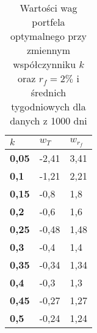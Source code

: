 \documentclass[magister]{dyplom}
\begin{document}
\begin{table}[ht]
	\centering
	\caption{Wartości wag portfela optymalnego przy zmiennym współczynniku $k$ oraz $r_f = 2\%$ i średnich tygodniowych dla danych z 1000 dni}
	\begin{tabular}{|l|l|l|}
		\hline
		\textbf{$k$} & \textbf{$w_T$} & \textbf{$w_{r_f}$} \\ \hline
		\textbf{0,05}                                             & -2,41         & 3,41           \\ \hline
		\textbf{0,1}                                              & -1,21         & 2,21           \\ \hline
		\textbf{0,15}                                             & -0,8          & 1,8            \\ \hline
		\textbf{0,2}                                              & -0,6          & 1,6            \\ \hline
		\textbf{0,25}                                             & -0,48         & 1,48           \\ \hline
		\textbf{0,3}                                              & -0,4          & 1,4            \\ \hline
		\textbf{0,35}                                             & -0,34         & 1,34           \\ \hline
		\textbf{0,4}                                              & -0,3          & 1,3            \\ \hline
		\textbf{0,45}                                             & -0,27         & 1,27           \\ \hline
		\textbf{0,5}                                              & -0,24         & 1,24           \\ \hline
	\end{tabular}
\end{table}
\end{document}

